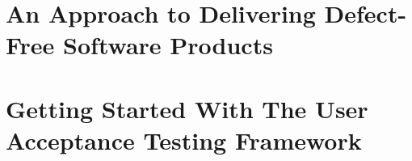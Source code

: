 \documentclass[letter, 11pt, twoside, openright, english]{memoir}
\begin{document}
\frontmatter

%


\mainmatter
%
\part{An Approach to Delivering Defect-Free Software Products}

\part{Getting Started With The User Acceptance Testing Framework}

%
%
\backmatter


\printindex
\end{document}
